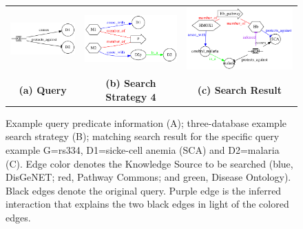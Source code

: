 \documentclass[11pt,notitlepage]{article}
\begin{document}
\begin{figure}[h!]
  \begin{tabular}{ccc}
  \includegraphics[width=1.4in]{baseproblem.png} &    
  \includegraphics[width=2in]{net4.png} &
  \includegraphics[width=2.5in]{net5.png} \\
                  {\bf (a) Query} & {\bf (b) Search Strategy 4} & {\bf (c) Search Result}
  \end{tabular}
  \caption{Example query predicate information (A); three-database example search strategy (B); matching search result for the specific query example G=rs334, D1=sicke-cell anemia (SCA) and D2=malaria (C). Edge color denotes the Knowledge Source to be searched (blue, DisGeNET; red, Pathway Commons; and green, Disease Ontology). Black edges denote the original query. Purple edge is the inferred interaction that explains the two black edges in light of the colored edges.}
  \label{fig:threedb}
\end{figure}
\end{document}
